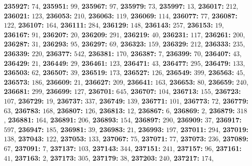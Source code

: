 \textsf{\bfseries 235927:} $74$, \textsf{\bfseries 235951:} $99$, \textsf{\bfseries 235967:} $97$, \textsf{\bfseries 235979:} $73$, \textsf{\bfseries 235997:} $13$, \textsf{\bfseries 236017:} $212$, \textsf{\bfseries 236021:} $123$, \textsf{\bfseries 236053:} $210$, \textsf{\bfseries 236063:} $119$, \textsf{\bfseries 236069:} $114$, \textsf{\bfseries 236077:} $77$, \textsf{\bfseries 236087:} $122$, \textsf{\bfseries 236107:} $164$, \textsf{\bfseries 236111:} $284$, \textsf{\bfseries 236129:} $148$, \textsf{\bfseries 236143:} $257$, \textsf{\bfseries 236153:} $19$, \textsf{\bfseries 236167:} $91$, \textsf{\bfseries 236207:} $20$, \textsf{\bfseries 236209:} $291$, \textsf{\bfseries 236219:} $40$, \textsf{\bfseries 236231:} $117$, \textsf{\bfseries 236261:} $200$, \textsf{\bfseries 236287:} $31$, \textsf{\bfseries 236293:} $95$, \textsf{\bfseries 236297:} $69$, \textsf{\bfseries 236323:} $159$, \textsf{\bfseries 236329:} $212$, \textsf{\bfseries 236333:} $235$, \textsf{\bfseries 236339:} $220$, \textsf{\bfseries 236377:} $542$, \textsf{\bfseries 236381:} $170$, \textsf{\bfseries 236387:} $7$, \textsf{\bfseries 236399:} $70$, \textsf{\bfseries 236407:} $43$, \textsf{\bfseries 236429:} $21$, \textsf{\bfseries 236449:} $29$, \textsf{\bfseries 236461:} $123$, \textsf{\bfseries 236471:} $43$, \textsf{\bfseries 236477:} $295$, \textsf{\bfseries 236479:} $133$, \textsf{\bfseries 236503:} $62$, \textsf{\bfseries 236507:} $39$, \textsf{\bfseries 236519:} $173$, \textsf{\bfseries 236527:} $126$, \textsf{\bfseries 236549:} $399$, \textsf{\bfseries 236563:} $45$, \textsf{\bfseries 236573:} $186$, \textsf{\bfseries 236609:} $21$, \textsf{\bfseries 236627:} $209$, \textsf{\bfseries 236641:} $163$, \textsf{\bfseries 236653:} $80$, \textsf{\bfseries 236659:} $240$, \textsf{\bfseries 236681:} $299$, \textsf{\bfseries 236699:} $127$, \textsf{\bfseries 236701:} $645$, \textsf{\bfseries 236707:} $104$, \textsf{\bfseries 236713:} $155$, \textsf{\bfseries 236723:} $107$, \textsf{\bfseries 236729:} $19$, \textsf{\bfseries 236737:} $337$, \textsf{\bfseries 236749:} $139$, \textsf{\bfseries 236771:} $101$, \textsf{\bfseries 236773:} $72$, \textsf{\bfseries 236779:} $63$, \textsf{\bfseries 236783:} $168$, \textsf{\bfseries 236807:} $126$, \textsf{\bfseries 236813:} $12$, \textsf{\bfseries 236867:} $6$, \textsf{\bfseries 236869:} $2$, \textsf{\bfseries 236879:} $318$, \textsf{\bfseries 236881:} $164$, \textsf{\bfseries 236891:} $206$, \textsf{\bfseries 236893:} $154$, \textsf{\bfseries 236897:} $290$, \textsf{\bfseries 236909:} $37$, \textsf{\bfseries 236917:} $597$, \textsf{\bfseries 236947:} $185$, \textsf{\bfseries 236981:} $39$, \textsf{\bfseries 236983:} $21$, \textsf{\bfseries 236993:} $197$, \textsf{\bfseries 237011:} $294$, \textsf{\bfseries 237019:} $138$, \textsf{\bfseries 237043:} $122$, \textsf{\bfseries 237053:} $133$, \textsf{\bfseries 237067:} $75$, \textsf{\bfseries 237071:} $77$, \textsf{\bfseries 237073:} $236$, \textsf{\bfseries 237089:} $67$, \textsf{\bfseries 237091:} $7$, \textsf{\bfseries 237137:} $103$, \textsf{\bfseries 237143:} $344$, \textsf{\bfseries 237151:} $241$, \textsf{\bfseries 237157:} $96$, \textsf{\bfseries 237161:} $41$, \textsf{\bfseries 237163:} $2$, \textsf{\bfseries 237173:} $305$, \textsf{\bfseries 237179:} $38$, \textsf{\bfseries 237203:} $240$, \textsf{\bfseries 237217:} $174$, 

